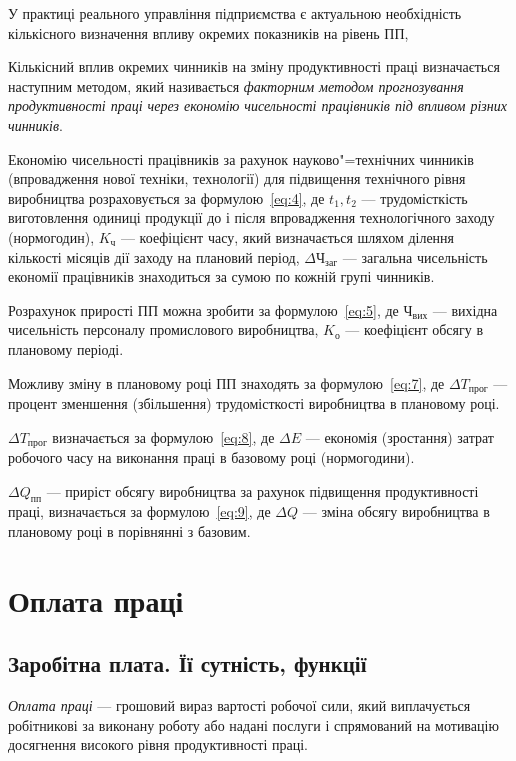 \documentclass[a5paper,10pt,notitlepage,pdftex,headsepline]{scrartcl}
\begin{document}
  У практиці реального управління підприємства є актуальною необхідність
  кількісного визначення впливу окремих показників на рівень ПП,

  Кількісний вплив окремих чинників на зміну продуктивності праці визначається
  наступним методом, який називається \emph{факторним методом прогнозування
    продуктивності праці через економію чисельності працівників під впливом
  різних чинників}.

  Економію чисельності працівників за рахунок науково"=технічних чинників
  (впровадження нової техніки, технології) для підвищення технічного рівня
  виробництва розраховується за формулою~\eqref{eq:4}, де $t_1, t_2$ ---
  трудомісткість виготовлення одиниці продукції до і після впровадження
  технологічного заходу (нормогодин), $K_\text{ч}$ --- коефіцієнт часу, який
  визначається шляхом ділення кількості місяців дії заходу на плановий період,
  $\Delta\text{Ч}_\text{заг}$ --- загальна чисельність економії працівників
  знаходиться за сумою по кожній групі чинників.

  Розрахунок прирості ПП можна зробити за формулою~\eqref{eq:5}, де
  $\text{Ч}_\text{вих}$ --- вихідна чисельність персоналу промислового
  виробництва, $K_\text{о}$ --- коефіцієнт обсягу в плановому періоді.

  Можливу зміну в плановому році ПП знаходять за формулою~\eqref{eq:7}, де
  $\Delta T_\text{прог}$ --- процент зменшення (збільшення) трудомісткості
  виробництва в плановому році.

  $\Delta T_\text{прог}$ визначається за формулою~\eqref{eq:8}, де $\Delta E$
  --- економія (зростання) затрат робочого часу на виконання праці в базовому
  році (нормогодини).

  $\Delta Q_\text{пп}$ --- приріст обсягу виробництва за рахунок підвищення
  продуктивності праці, визначається за формулою~\eqref{eq:9}, де $\Delta Q$
  --- зміна обсягу виробництва в плановому році в порівнянні з базовим.

\section{Оплата праці}
  \subsection{Заробітна плата. Її сутність, функції}
    \emph{Оплата праці} --- грошовий вираз вартості робочої сили, який
    виплачується робітникові за виконану роботу або надані послуги і
    спрямований на мотивацію досягнення високого рівня продуктивності праці.
\end{document}
